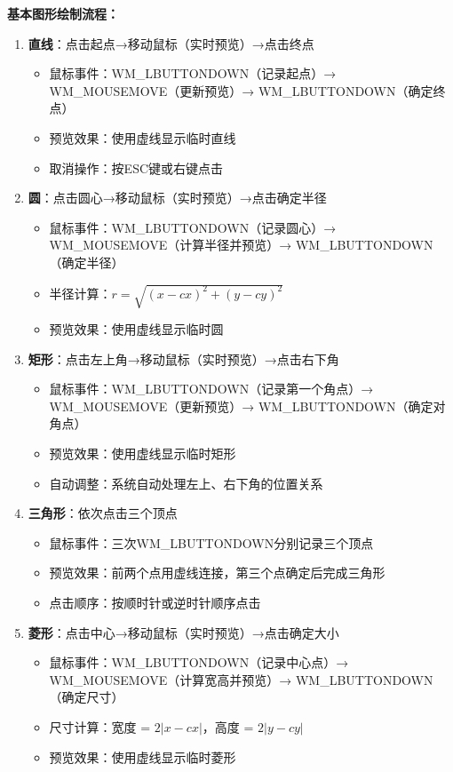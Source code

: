 \documentclass[12pt,a4paper]{article}
\begin{document}
\begin{tcolorbox}
\textbf{基本图形绘制流程：}
\begin{enumerate}
    \item \textbf{直线}：点击起点→移动鼠标（实时预览）→点击终点
    \begin{itemize}
        \item 鼠标事件：WM\_LBUTTONDOWN（记录起点）→ WM\_MOUSEMOVE（更新预览）→ WM\_LBUTTONDOWN（确定终点）
        \item 预览效果：使用虚线显示临时直线
        \item 取消操作：按ESC键或右键点击
    \end{itemize}
    
    \item \textbf{圆}：点击圆心→移动鼠标（实时预览）→点击确定半径
    \begin{itemize}
        \item 鼠标事件：WM\_LBUTTONDOWN（记录圆心）→ WM\_MOUSEMOVE（计算半径并预览）→ WM\_LBUTTONDOWN（确定半径）
        \item 半径计算：$r = \sqrt{(x-cx)^2 + (y-cy)^2}$
        \item 预览效果：使用虚线显示临时圆
    \end{itemize}
    
    \item \textbf{矩形}：点击左上角→移动鼠标（实时预览）→点击右下角
    \begin{itemize}
        \item 鼠标事件：WM\_LBUTTONDOWN（记录第一个角点）→ WM\_MOUSEMOVE（更新预览）→ WM\_LBUTTONDOWN（确定对角点）
        \item 预览效果：使用虚线显示临时矩形
        \item 自动调整：系统自动处理左上、右下角的位置关系
    \end{itemize}
    
    \item \textbf{三角形}：依次点击三个顶点
    \begin{itemize}
        \item 鼠标事件：三次WM\_LBUTTONDOWN分别记录三个顶点
        \item 预览效果：前两个点用虚线连接，第三个点确定后完成三角形
        \item 点击顺序：按顺时针或逆时针顺序点击
    \end{itemize}
    
    \item \textbf{菱形}：点击中心→移动鼠标（实时预览）→点击确定大小
    \begin{itemize}
        \item 鼠标事件：WM\_LBUTTONDOWN（记录中心点）→ WM\_MOUSEMOVE（计算宽高并预览）→ WM\_LBUTTONDOWN（确定尺寸）
        \item 尺寸计算：宽度 = $2|x-cx|$，高度 = $2|y-cy|$
        \item 预览效果：使用虚线显示临时菱形
    \end{itemize}
    

\end{enumerate}
\end{tcolorbox}
\end{document}
